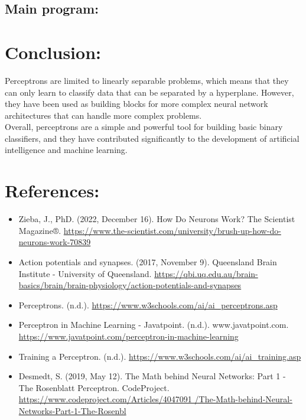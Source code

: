 \documentclass[12pt]{article}
\begin{document}
\subsection{Main program:}



\section{Conclusion:}
Perceptrons are limited to linearly separable problems, which means that they can only learn to
classify data that can be separated by a hyperplane. However, they have been used as building blocks
for more
complex neural network architectures that can handle more complex problems.\\
Overall, perceptrons are a simple and powerful tool for building basic binary classifiers, and
they have contributed significantly to the development of artificial intelligence and machine learning.


\section{References:}
\begin{itemize}
\item Zieba, J., PhD. (2022, December 16). How Do Neurons Work? The Scientist Magazine®.
  \url{https://www.the-scientist.com/university/brush-up-how-do-neurons-work-70839}
\item Action potentials and synapses. (2017, November 9). Queensland Brain Institute - University
  of Queensland.
  \url{https://qbi.uq.edu.au/brain-basics/brain/brain-physiology/action-potentials-and-synapses}
\item Perceptrons. (n.d.). \url{https://www.w3schools.com/ai/ai_perceptrons.asp}
\item Perceptron in Machine Learning - Javatpoint. (n.d.). www.javatpoint.com.
  \url{https://www.javatpoint.com/perceptron-in-machine-learning}
\item Training a Perceptron. (n.d.). \url{https://www.w3schools.com/ai/ai_training.asp}
\item Desmedt, S. (2019, May 12). The Math behind Neural Networks: Part 1 - The Rosenblatt Perceptron.
  CodeProject.
  \url{https://www.codeproject.com/Articles/4047091
    /The-Math-behind-Neural-Networks-Part-1-The-Rosenbl}
\end{itemize}
\end{document}
